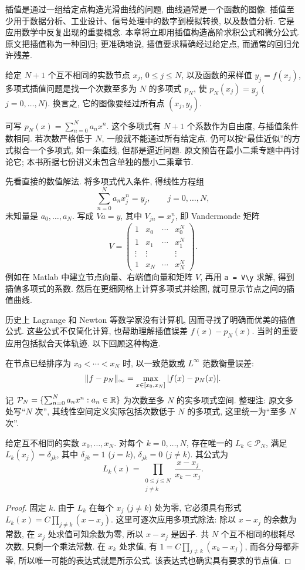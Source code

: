 \label{ch:interpolation}

插值是通过一组给定点构造光滑曲线的问题, 曲线通常是一个函数的图像. 插值至少用于数据分析、工业设计、信号处理中的数字到模拟转换, 以及数值分析. 它是应用数学中反复出现的重要概念. 本章将立即用插值构造高阶求积公式和微分公式. 原文把插值称为一种回归; 更准确地说, 插值要求精确经过给定点, 而通常的回归允许残差.


给定 $N+1$ 个互不相同的实数节点 $x_j$, $0\leq j\leq N$, 以及函数的采样值 $y_j=f(x_j)$, 多项式插值问题是找一个次数至多为 $N$ 的多项式 $p_N$, 使 $p_N(x_j)=y_j$ ($j=0,\ldots,N$). 换言之, 它的图像要经过所有点 $(x_j,y_j)$.

可写 $p_N(x)=\sum_{n=0}^{N}a_nx^n$. 这个多项式有 $N+1$ 个系数作为自由度, 与插值条件数相同. 若次数严格低于 $N$, 一般就不能通过所有给定点. 仍可以按“最佳近似”的方式拟合一个多项式, 如一条直线, 但那是逼近问题. 原文预告在最小二乘专题中再讨论它; 本书所据七份讲义未包含单独的最小二乘章节.

先看直接的数值解法. 将多项式代入条件, 得线性方程组
\[
\sum_{n=0}^{N}a_nx_j^n=y_j,\qquad j=0,\ldots,N,
\]
未知量是 $a_0,\ldots,a_N$. 写成 $Va=y$, 其中 $V_{jn}=x_j^n$, 即 Vandermonde 矩阵
\[
V=\begin{pmatrix}
1&x_0&\cdots&x_0^N\\
1&x_1&\cdots&x_1^N\\
\vdots&\vdots&&\vdots\\
1&x_N&\cdots&x_N^N
\end{pmatrix}.
\]
例如在 Matlab 中建立节点向量、右端值向量和矩阵 $V$, 再用 \texttt{a = V\textbackslash y} 求解, 得到插值多项式的系数. 然后在更细网格上计算多项式并绘图, 就可显示节点之间的插值曲线.

历史上 Lagrange 和 Newton 等数学家没有计算机, 因而寻找了明确而优美的插值公式. 这些公式不仅简化计算, 也帮助理解插值误差 $f(x)-p_N(x)$. 当时的重要应用包括拟合天体轨迹. 以下回顾这种构造.

在节点已经排序为 $x_0<\cdots<x_N$ 时, 以一致范数或 $L^\infty$ 范数衡量误差:
\[
\lVert f-p_N\rVert_\infty=\max_{x\in[x_0,x_N]}|f(x)-p_N(x)|.
\]
记 $\mathcal P_N=\{\sum_{n=0}^{N}a_nx^n:a_n\in\mathbb R\}$ 为次数至多 $N$ 的实多项式空间. 整理注: 原文多处写“$N$ 次”, 其线性空间定义实际包括次数低于 $N$ 的多项式, 这里统一为“至多 $N$ 次”.

\begin{lemma}\label{lem:lagrange-basis}
给定互不相同的实数 $x_0,\ldots,x_N$. 对每个 $k=0,\ldots,N$, 存在唯一的 $L_k\in\mathcal P_N$, 满足 $L_k(x_j)=\delta_{jk}$, 其中 $\delta_{jk}=1$ ($j=k$), $\delta_{jk}=0$ ($j\neq k$). 其公式为
\[
L_k(x)=\prod_{\substack{0\leq j\leq N\\j\neq k}}\frac{x-x_j}{x_k-x_j}.
\]
\end{lemma}
\begin{proof}
固定 $k$. 由于 $L_k$ 在每个 $x_j$ ($j\neq k$) 处为零, 它必须具有形式 $L_k(x)=C\prod_{j\neq k}(x-x_j)$. 这里可逐次应用多项式除法: 除以 $x-x_j$ 的余数为常数, 在 $x_j$ 处求值可知余数为零, 所以 $x-x_j$ 是因子. 共 $N$ 个互不相同的根耗尽次数, 只剩一个乘法常数. 在 $x_k$ 处求值, 有 $1=C\prod_{j\neq k}(x_k-x_j)$, 而各分母都非零, 所以唯一可能的表达式就是所示公式. 该表达式也确实具有要求的节点值.
\end{proof}

